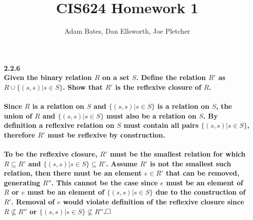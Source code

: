 \documentclass[12pt,letterpaper]{article}
\title{CIS624 Homework 1}
\author{Adam Bates, Dan Ellsworth, Joe Pletcher}
\newcommand{\hwSect}[1] {\noindent\large\bf#1\rm\normalsize}
\newcommand{\done}{$\hfill\square$}
\begin{document}
\maketitle
\noindent

\hwSect{2.2.6}\\
Given the binary relation $R$ on a set $S$. Define the relation $R'$ as $R \cup \{(s,s) | s \in S \}$. Show that $R'$ is the reflexive closure of $R$.\\ \\
Since $R$ is a relation on $S$ and $\{(s,s) | s \in S \}$ is a relation on $S$, the union of $R$ and  $\{(s,s) | s \in S \}$ must also be a relation on $S$. By definition a reflexive relation on $S$ must contain all pairs $\{(s,s) | s \in S \}$, therefore $R'$ must be reflexive by construction.\\ \\
To be the reflexive closure, $R'$ must be the smallest relation for which $R \subseteq R'$ and $\{(s,s) | s \in S \} \subseteq R'$. Assume $R'$ is not the smallest such relation, then there must be an element $e \in R'$ that can be removed, generating $R''$. This cannot be the case since $e$ must be an element of $R$ or $e$ must be an element of $\{(s,s) | s \in S \}$ due to the construction of $R'$. Removal of $e$ would violate definition of the reflexive closure since $R \not\subseteq R''$ or $\{(s,s) | s \in S \} \not\subseteq R''$.\done\\


\begin{comment}
We need to show that A) all $(s_i,s_i)$ are there for all $s \in S$ to be reflexive.  We also need to show that this is the smallest possible set.  We can do this by showing that we have a reflexive set R'.  It will be the reflexive closure of R if it is the smallest possible set with the property.  So if we remove a single element it is either a component of R, a component of R ref, or both.  So if we removed it we would be broken.  

PROOF BY CONTRADICTION QED MFER
done
\end{comment}
\end{document}
